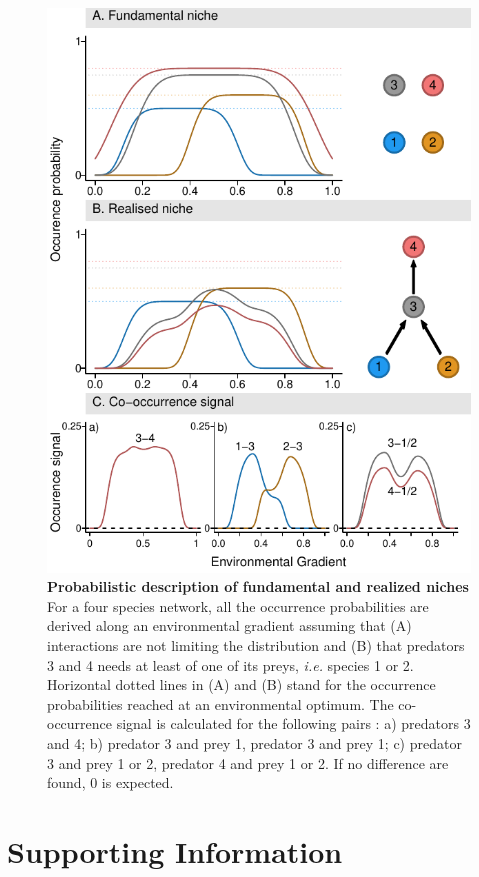 \begin{figure}[htbp]
\centering
\includegraphics[width=.85\textwidth]{chapitre3/figConcept.pdf}
\caption[Probabilistic description of fundamental and realized
niches]{\textbf{Probabilistic description of fundamental and realized
niches} For a four species network, all the occurrence probabilities are
derived along an environmental gradient assuming that (A) interactions
are not limiting the distribution and (B) that predators 3 and 4 needs
at least of one of its preys, \emph{i.e.} species 1 or 2. Horizontal
dotted lines in (A) and (B) stand for the occurrence probabilities
reached at an environmental optimum. The co-occurrence signal is
calculated for the following pairs : a) predators 3 and 4; b) predator 3
and prey 1, predator 3 and prey 1; c) predator 3 and prey 1 or 2,
predator 4 and prey 1 or 2. If no difference are found, 0 is
expected.\label{fig:box1}}
\end{figure}

\newpage




\section{Supporting Information}\label{supporting-information}

